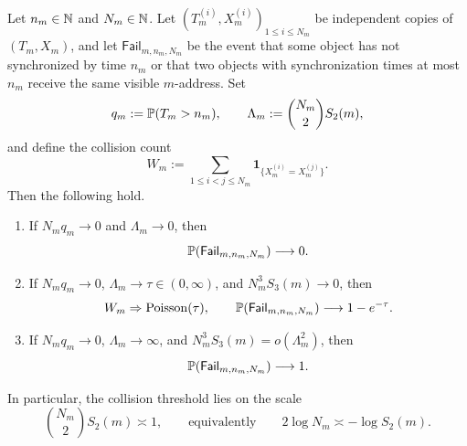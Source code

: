 \begin{theorem}
\label{thm:double-budget-poisson}
Let \(n_m\in\mathbb{N}\) and \(N_m\in\mathbb{N}\).  Let
\((T_m^{(i)},X_m^{(i)})_{1\leq i\leq N_m}\) be independent copies of
\((T_m,X_m)\), and let \(\mathsf{Fail}_{m,n_m,N_m}\) be the event that
some object has not synchronized by time \(n_m\) or that two objects
with synchronization times at most \(n_m\) receive the same visible
\(m\)-address.  Set
\[
  q_m:=\mathbb{P}(T_m>n_m),
  \qquad
  \Lambda_m:=\binom{N_m}{2}S_2(m),
\]
and define the collision count
\[
  W_m:=\sum_{1\leq i<j\leq N_m}
       \mathbf{1}_{\{X_m^{(i)}=X_m^{(j)}\}}.
\]
Then the following hold.
\begin{enumerate}[label=(\roman*)]
  \item If \(N_m q_m\to 0\) and \(\Lambda_m\to 0\), then
    \[
      \mathbb{P}(\mathsf{Fail}_{m,n_m,N_m})\longrightarrow 0.
    \]
  \item If \(N_m q_m\to 0\), \(\Lambda_m\to\tau\in(0,\infty)\), and
    \(N_m^3S_3(m)\to 0\), then
    \[
      W_m \Rightarrow \mathrm{Poisson}(\tau),
      \qquad
      \mathbb{P}(\mathsf{Fail}_{m,n_m,N_m})\longrightarrow 1-e^{-\tau}.
    \]
  \item If \(N_m q_m\to 0\), \(\Lambda_m\to\infty\), and
    \(N_m^3S_3(m)=o(\Lambda_m^2)\), then
    \[
      \mathbb{P}(\mathsf{Fail}_{m,n_m,N_m})\longrightarrow 1.
    \]
\end{enumerate}
In particular, the collision threshold lies on the scale
\[
  \binom{N_m}{2}S_2(m)\asymp 1,
  \qquad\text{equivalently}\qquad
  2\log N_m \asymp -\log S_2(m).
\]
\end{theorem}

